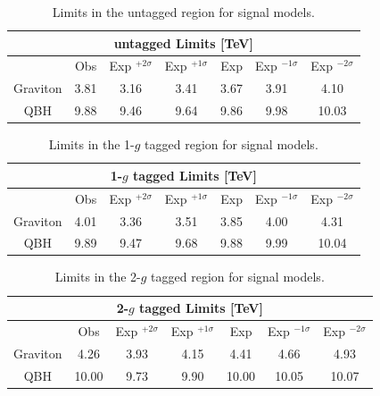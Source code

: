 \begin{table}
	\begin{center} 
		\begin{tabular}{ c c c c c c c }
			\hline
			\multicolumn{7}{c}{ untagged  Limits [TeV]}  \\ \hline
			& Obs & Exp $^{+2\sigma}$&Exp $^{+1\sigma}$ &Exp & Exp $^{-1\sigma}$&Exp $^{-2\sigma}$\\	\hline
			Graviton&3.81 &3.16&3.41  &3.67 &3.91&4.10\\\hline
			QBH&9.88 &9.46&9.64 &9.86 &9.98&10.03\\
			\hline
		\end{tabular}
		\caption{ Limits in the untagged region for signal models.}
		\label{tab:0g}
	\end{center}
\end{table}

\begin{table}
\begin{center} 
\begin{tabular}{ c c c c c c c }
	\hline
	\multicolumn{7}{c}{ 1-$g$ tagged  Limits [TeV]}  \\ \hline
	 & Obs & Exp $^{+2\sigma}$&Exp $^{+1\sigma}$ &Exp & Exp $^{-1\sigma}$&Exp $^{-2\sigma}$\\	\hline
	Graviton&4.01 &3.36&3.51  &3.85 &4.00&4.31\\\hline
QBH&9.89 &9.47&9.68 &9.88 &9.99&10.04\\
	\hline
\end{tabular}
		\caption{ Limits in the 1-$g$ tagged region for signal models.}
\label{tab:1g}
	\end{center}
\end{table}

\begin{table}
\begin{center}
\begin{tabular}{ c c c c c c c }
	\hline
	\multicolumn{7}{c}{ 2-$g$ tagged  Limits [TeV]}  \\ \hline
	& Obs & Exp $^{+2\sigma}$&Exp $^{+1\sigma}$ &Exp & Exp $^{-1\sigma}$&Exp $^{-2\sigma}$\\	\hline
	Graviton&4.26&3.93&4.15 &4.41&4.66&4.93\\\hline
	QBH&10.00 &9.73&9.90 &10.00  &10.05&10.07\\
	\hline
\end{tabular}
	\caption{Limits in the 2-$g$ tagged region for signal models.}
\label{tab:2g}
	\end{center}
\end{table}


